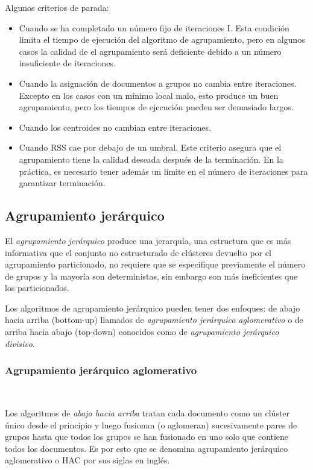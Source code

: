 \documentclass{llncs}
\begin{document}
Algunos criterios de parada:
\begin{itemize}
	\item Cuando se ha completado un número fijo de iteraciones I. Esta condición limita el tiempo de ejecución del algoritmo de agrupamiento, pero en algunos casos la calidad de el agrupamiento será deficiente debido a un número insuficiente de iteraciones.
	\item Cuando la asignación de documentos a grupos no cambia entre iteraciones. Excepto en los casos con un m\'inimo local malo, esto produce un buen agrupamiento, pero los tiempos de ejecución pueden ser demasiado largos.
	\item Cuando los centroides no cambian entre iteraciones.
	\item Cuando RSS cae por debajo de un umbral. Este criterio asegura que el agrupamiento tiene la calidad deseada después de la terminación. En la práctica, es necesario tener adem\'as un límite en el número de iteraciones para garantizar terminación.
\end{itemize}

\subsection{Agrupamiento jer\'arquico}

El \textit{agrupamiento jerárquico} produce una jerarquía, una estructura que es más informativa que el conjunto no estructurado de clústeres devuelto por el agrupamiento particionado, no requiere que se especifique previamente el número de grupos y la mayoría son deterministas, sin embargo son m\'as ineficientes que los particionados.

Los algoritmos de agrupamiento jerárquico pueden tener dos enfoques: de abajo hacia arriba (bottom-up) llamados de \textit{agrupamiento jer\'arquico aglomerativo} o de arriba hacia abajo (top-down) conocidos como de \textit{agrupamiento jer\'arquico divisivo}. 

\subsubsection{Agrupamiento jer\'arquico aglomerativo}
\textcolor{white}{.}

\vspace{0.5em}
Los algoritmos de \textit{abajo hacia arriba} tratan cada documento como un clúster único desde el principio y luego fusionan (o aglomeran) sucesivamente pares de grupos hasta que todos los grupos se han fusionado en uno solo que contiene todos los documentos. 
Es por esto que se denomina agrupamiento jerárquico aglomerativo o HAC por sus siglas en ingl\'es. 
\end{document}

